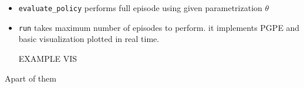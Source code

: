 \documentclass[12pt]{article}
\begin{document}
\begin{itemize}
\item \texttt{evaluate\_policy} performs full episode using given parametrization $\theta$

\item \texttt{run} takes maximum number of episodes to perform. it implements PGPE and basic visualization plotted in real time.

EXAMPLE VIS

\end{itemize}



Apart of them

\newpage


 
\end{document}
